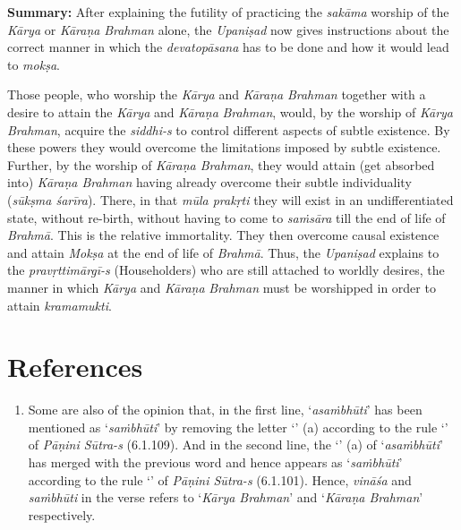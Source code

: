 \textbf{Summary:} After explaining the futility of practicing the \emph{sakāma} worship of the \emph{Kārya} or \emph{Kāraṇa} \emph{Brahman} alone, the \emph{Upaniṣad} now gives instructions about the correct manner in which the \emph{devatopāsana} has to be done and how it would lead to \emph{mokṣa}.

Those people, who worship the \emph{Kārya} and \emph{Kāraṇa} \emph{Brahman} together with a desire to attain the \emph{Kārya} and \emph{Kāraṇa} \emph{Brahman}, would, by the worship of \emph{Kārya} \emph{Brahman}, acquire the \emph{siddhi-s} to control different aspects of subtle existence. By these powers they would overcome the limitations imposed by subtle existence. Further, by the worship of \emph{Kāraṇa Brahman}, they would attain (get absorbed into) \emph{Kāraṇa Brahman} having already overcome their subtle individuality (\emph{sūkṣma śarīra}). There, in that \emph{mūla prakṛti} they will exist in an undifferentiated state, without re-birth, without having to come to \emph{saṁsāra} till the end of life of \emph{Brahmā}. This is the relative immortality. They then overcome causal existence and attain \emph{Mokṣa} at the end of life of \emph{Brahmā}. Thus, the \emph{Upaniṣad} explains to the \emph{pravṛttimārgī-s} (Householders) who are still attached to worldly desires, the manner in which \emph{Kārya} and \emph{Kāraṇa} \emph{Brahman} must be worshipped in order to attain \emph{kramamukti}.

\section*{References}

\begin{enumerate}
\item
  Some are also of the opinion that, in the first line, `\emph{asaṁbhūti}' has been mentioned as `\emph{saṁbhūti}' by removing the letter `' (a) according to the rule `' of \emph{Pāṇini Sūtra-s} (6.1.109). And in the second line, the `' (a) of `\emph{asaṁbhūti}' has merged with the previous word and hence appears as `\emph{saṁbhūti}' according to the rule `' of \emph{Pāṇini Sūtra-s} (6.1.101). Hence, \emph{vināśa} and \emph{saṁbhūti} in the verse refers to `\emph{Kārya Brahman}' and `\emph{Kāraṇa Brahman}' respectively.
\end{enumerate}

